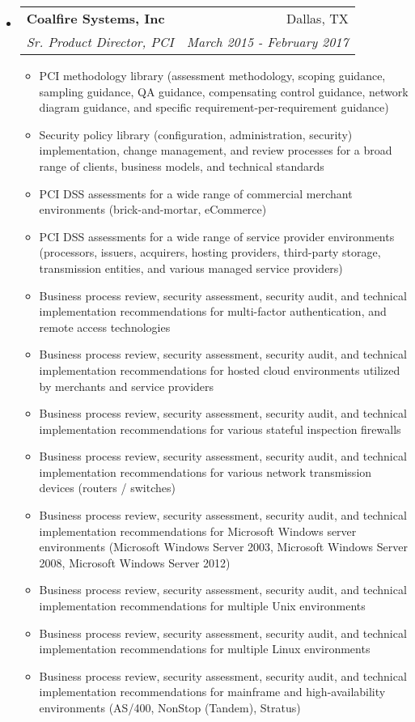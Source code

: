 \documentclass[letterpaper,11pt]{article}
\makeatletter
\newcommand{\resitem}[1]{\item #1 \vspace{-2pt}}
\newcommand{\ressubheading}[4]{
\begin{tabular*}{6.5in}{l@{\cftdotfill{\cftsecdotsep}\extracolsep{\fill}}r}
		\textbf{#1} & #2 \\
		\textit{#3} & \textit{#4} \\
\end{tabular*}\vspace{-6pt}}
\makeatother
\begin{document}
\begin{itemize}
\item
	\ressubheading{Coalfire Systems, Inc}{Dallas, TX}{Sr. Product Director, PCI}{March 2015 - February 2017}
	\begin{itemize}
            \resitem{PCI methodology library (assessment methodology, scoping guidance, sampling guidance, QA guidance, compensating control guidance, network diagram guidance, and specific requirement-per-requirement guidance)}
            \resitem{Security policy library (configuration, administration, security) implementation, change management, and review processes for a broad range of clients, business models, and technical standards}
            \resitem{PCI DSS assessments for a wide range of commercial merchant environments (brick-and-mortar, eCommerce)}
            \resitem{PCI DSS assessments for a wide range of service provider environments (processors, issuers, acquirers, hosting providers, third-party storage, transmission entities, and various managed service providers)}
            \resitem{Business process review, security assessment, security audit, and technical implementation recommendations for multi-factor authentication, and remote access technologies}
            \resitem{Business process review, security assessment, security audit, and technical implementation recommendations for hosted cloud environments utilized by merchants and service providers}
            \resitem{Business process review, security assessment, security audit, and technical implementation recommendations for various stateful inspection firewalls}
            \resitem{Business process review, security assessment, security audit, and technical implementation recommendations for various network transmission devices (routers / switches)}
            \resitem{Business process review, security assessment, security audit, and technical implementation recommendations for Microsoft Windows server environments (Microsoft Windows Server 2003, Microsoft Windows Server 2008, Microsoft Windows Server 2012)}
            \resitem{Business process review, security assessment, security audit, and technical implementation recommendations for multiple Unix environments}
            \resitem{Business process review, security assessment, security audit, and technical implementation recommendations for multiple Linux environments}
            \resitem{Business process review, security assessment, security audit, and technical implementation recommendations for mainframe and high-availability environments (AS/400, NonStop (Tandem), Stratus)}
	\end{itemize}


\end{itemize}
\end{document}
